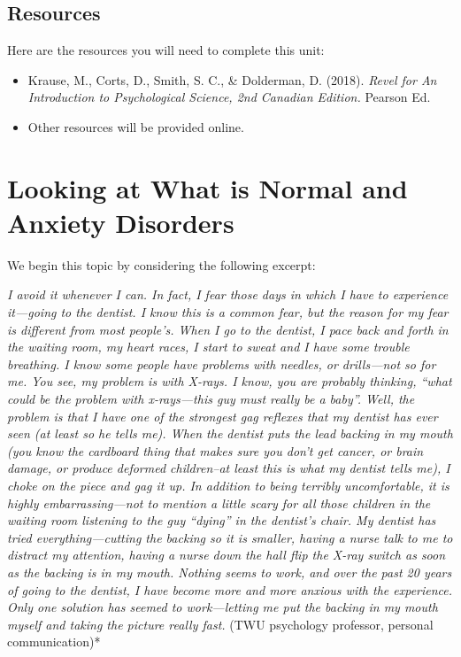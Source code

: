 \documentclass[
]{book}
\providecommand{\tightlist}{%
  \setlength{\itemsep}{0pt}\setlength{\parskip}{0pt}}
\begin{document}
\hypertarget{resources-10}{%
\subsection*{Resources}\label{resources-10}}

Here are the resources you will need to complete this unit:

\begin{itemize}
\tightlist
\item
  Krause, M., Corts, D., Smith, S. C., \& Dolderman, D. (2018). \emph{Revel for An Introduction to Psychological Science, 2nd Canadian Edition.} Pearson Ed.\\
\item
  Other resources will be provided online.
\end{itemize}

\hypertarget{looking-at-what-is-normal-and-anxiety-disorders}{%
\section{Looking at What is Normal and Anxiety Disorders}\label{looking-at-what-is-normal-and-anxiety-disorders}}

We begin this topic by considering the following excerpt:

\emph{I avoid it whenever I can. In fact, I fear those days in which I have to experience it---going to the dentist. I know this is a common fear, but the reason for my fear is different from most people's. When I go to the dentist, I pace back and forth in the waiting room, my heart races, I start to sweat and I have some trouble breathing. I know some people have problems with needles, or drills---not so for me. You see, my problem is with X-rays. I know, you are probably thinking, ``what could be the problem with x-rays---this guy must really be a baby''. Well, the problem is that I have one of the strongest gag reflexes that my dentist has ever seen (at least so he tells me). When the dentist puts the lead backing in my mouth (you know the cardboard thing that makes sure you don't get cancer, or brain damage, or produce deformed children--at least this is what my dentist tells me), I choke on the piece and gag it up. In addition to being terribly uncomfortable, it is highly embarrassing---not to mention a little scary for all those children in the waiting room listening to the guy ``dying'' in the dentist's chair. My dentist has tried everything---cutting the backing so it is smaller, having a nurse talk to me to distract my attention, having a nurse down the hall flip the X-ray switch as soon as the backing is in my mouth. Nothing seems to work, and over the past 20 years of going to the dentist, I have become more and more anxious with the experience. Only one solution has seemed to work---letting me put the backing in my mouth myself and taking the picture really fast.} (TWU psychology professor, personal communication)*
\end{document}
